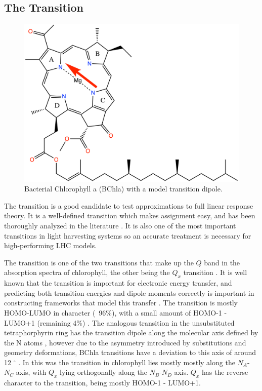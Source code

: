 \subsection{The \Qy Transition}
\label{subsec:qy_transition}
\begin{figure}
    \centering
    \includegraphics{chapters/4_chl_xtb/chlorophyll_Qy.png}
    \caption{Bacterial Chlorophyll a (BChla) with a model \Qy transition dipole.}
    \label{fig:bchla_qy}
\end{figure}

The \Qy transition is a good candidate to test approximations to full linear response 
theory. It is a well-defined transition which makes assignment easy, and has been
thoroughly analyzed in the literature \cite{Strain1963, BelenOviedo2011, Zucchelli2002, Kim2020, Sirohiwal2020}. 
It is also one of the most important transitions in light harvesting systems so 
an accurate treatment is necessary for high-performing LHC models.

The \Qy transition is one of the two transitions that make up the $Q$ band in the
absorption spectra of chlorophyll, the other being the $Q_x$ transition \cite{Sirohiwal2020}.
It is well known that the \Qy transition is important for electronic energy transfer, 
and predicting both transition energies and dipole moments correctly is important 
in constructing  frameworks that model this transfer \cite{Zazubovich2001}. The
\Qy transition is mostly HOMO-LUMO in character (~96\%), with a small amount of 
HOMO-1 - LUMO+1 (remaining 4\%) \cite{Saito2020}. The analogous transition in the 
unsubstituted tetraphorphyrin ring has the transition dipole along the molecular
axis defined by the N atoms \cite{Fragata1988}, however due to the asymmetry introduced
by substitutions and geometry deformations, BChla \Qy transitions have a deviation
to this axis of around 12 $^{\circ}$ \cite{BelenOviedo2011}. In this was the \Qy
transition in chlorophyll lies mostly mostly along the $N_A$-$N_C$ axis, with $Q_x$
lying orthogonally along the $N_B$-$N_D$ axis. $Q_x$ has the reverse character to
the \Qy transition, being mostly HOMO-1 - LUMO+1.

